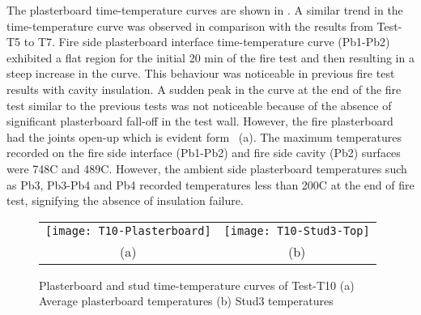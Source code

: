 The plasterboard time-temperature curves are shown in . A similar trend in the time-temperature curve was observed in comparison with the results from Test-T5 to T7. Fire side plasterboard interface time-temperature curve (Pb1-Pb2) exhibited a flat region for the initial 20 min of the fire test and then resulting in a steep increase in the curve. This behaviour was noticeable in previous fire test results with cavity insulation. A sudden peak in the curve at the end of the fire test similar to the previous tests was not noticeable because of the absence of significant plasterboard fall-off in the test wall. However, the fire plasterboard had the joints open-up which is evident form ~(a). The maximum temperatures recorded on the fire side interface (Pb1-Pb2) and fire side cavity (Pb2) surfaces were 748\degree C and 489\degree C. However, the ambient side plasterboard temperatures such as Pb3, Pb3-Pb4 and Pb4 recorded temperatures less than 200\degree C at the end of fire test, signifying the absence of insulation failure.
\begin{figure}[!htbp]
	\centering
		\begin{tabular}{cc}
			\texttt{[image: T10-Plasterboard]} & \texttt{[image: T10-Stud3-Top]} \\ 
			(a) & (b) \\ 
		\end{tabular} 
		\caption{Plasterboard and stud time-temperature curves of Test-T10 (a) Average plasterboard temperatures (b) Stud3 temperatures}
		\label{fig:T10-time-temperature}
\end{figure}

